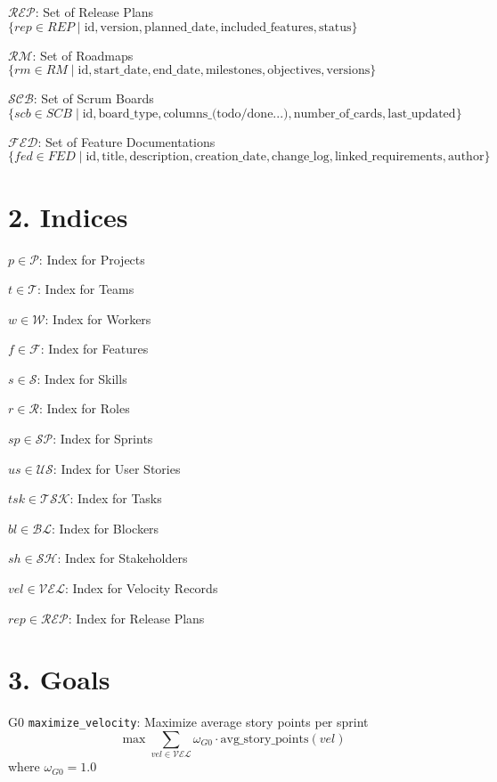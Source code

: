 \documentclass[12pt]{article}
\begin{document}
    \item $ \mathcal{REP} $: Set of Release Plans $ \{ rep \in REP \mid \text{id}, \text{version}, \text{planned\_date}, \text{included\_features}, \text{status} \} $
    \item $ \mathcal{RM} $: Set of Roadmaps $ \{ rm \in RM \mid \text{id}, \text{start\_date}, \text{end\_date}, \text{milestones}, \text{objectives}, \text{versions} \} $
    \item $ \mathcal{SCB} $: Set of Scrum Boards $ \{ scb \in SCB \mid \text{id}, \text{board\_type}, \text{columns\_(todo/done...)}, \text{number\_of\_cards}, \text{last\_updated} \} $
    \item $ \mathcal{FED} $: Set of Feature Documentations $ \{ fed \in FED \mid \text{id}, \text{title}, \text{description}, \text{creation\_date}, \text{change\_log}, \text{linked\_requirements}, \text{author} \} $

\section{2. Indices}
\item $ p \in \mathcal{P} $: Index for Projects
    \item $ t \in \mathcal{T} $: Index for Teams
    \item $ w \in \mathcal{W} $: Index for Workers
    \item $ f \in \mathcal{F} $: Index for Features
    \item $ s \in \mathcal{S} $: Index for Skills
    \item $ r \in \mathcal{R} $: Index for Roles
    \item $ sp \in \mathcal{SP} $: Index for Sprints
    \item $ us \in \mathcal{US} $: Index for User Stories
    \item $ tsk \in \mathcal{TSK} $: Index for Tasks
    \item $ bl \in \mathcal{BL} $: Index for Blockers
    \item $ sh \in \mathcal{SH} $: Index for Stakeholders
    \item $ vel \in \mathcal{VEL} $: Index for Velocity Records
    \item $ rep \in \mathcal{REP} $: Index for Release Plans

\section{3. Goals}
\item[G0] \texttt{maximize\_velocity}: Maximize average story points per sprint
    \[
    \max \sum_{vel \in \mathcal{VEL}} \omega_{G0} \cdot \text{avg\_story\_points}(vel)
    \]
    where $ \omega_{G0} = 1.0 $
\end{document}

